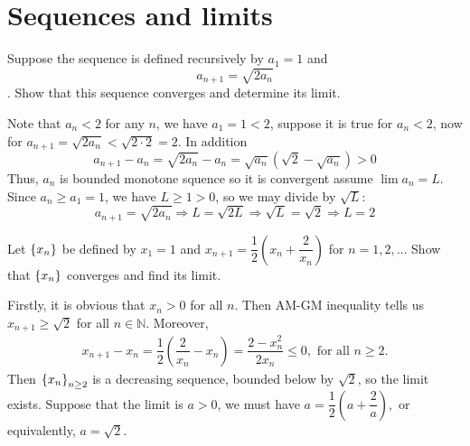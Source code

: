 \section{Sequences and limits}\label{p:sequences}

\begin{problem}
Suppose the sequence is defined recursively by $a_1 = 1$ and $$a_{n+1} = \sqrt{2a_n}$$. Show that this sequence converges and determine its limit.
\begin{solution}
Note that $a_n < 2$ for any $n$, we have $a_1=1<2$, suppose it is true for $a_n<2$, now for $a_{n+1} = \sqrt{2a_n} < \sqrt{2\cdot 2} = 2 $. In addition $$a_{n+1} - a_n= \sqrt{2a_n}  - a_n = \sqrt{a_n}(\sqrt{2} - \sqrt{a_n})>0$$
    Thus, $a_n$ is bounded monotone squence so it is convergent assume $\lim a_n = L$. Since $a_n\geq a_1 = 1$, we have $L\geq 1>0$, so we may divide by $\sqrt{L}$: \[a_{n+1} = \sqrt{2a_n} \Rightarrow L = \sqrt{2L} \Rightarrow \sqrt{L} = \sqrt{2} \Rightarrow L=2\]
\end{solution}
\end{problem}

\begin{problem}
Let $\left\{ x_n\right\}$ be defined by $x_1=1$ and $x_{n+1}=\dfrac{1}{2}(x_n+\dfrac{2}{x_n})$ for $n=1,2,\ldots$ Show that $\left\{ x_n\right\}$ converges and find its limit.
\begin{solution}
Firstly, it is obvious that $x_n>0$ for all $n.$ Then AM-GM inequality tells us $x_{n+1}\ge \sqrt{2}$ for all $n\in\mathbb{N}.$ Moreover,
\begin{align*}
    x_{n+1}-x_{n}=\dfrac{1}{2}(\dfrac{2}{x_n}-x_n)=\dfrac{2-x_n^2}{2x_n}\le 0,\text{ for all }n\ge 2.
\end{align*}
Then $\left\{ x_n\right\}_{n\ge 2}$ is a decreasing sequence, bounded below by $\sqrt{2}$, so the limit exists. Suppose that the limit is $a>0$, we must have $a=\dfrac{1}{2}(a+\dfrac{2}{a}),$ or equivalently, $a=\sqrt{2}.$
\end{solution}
\end{problem}

